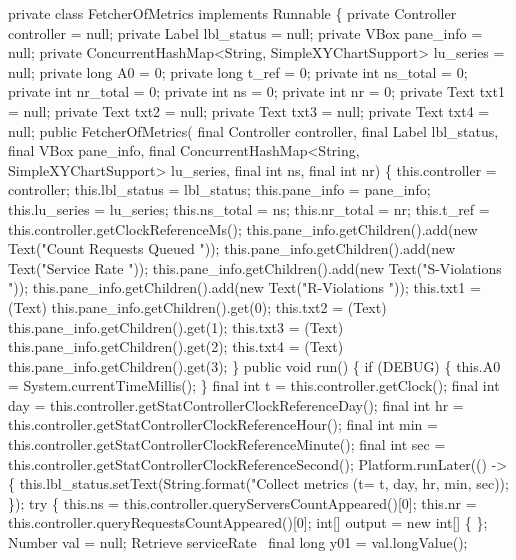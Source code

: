 \nwenddocs{}\plusendmoddef
private class FetcherOfMetrics implements Runnable \{
  private Controller controller = null;
  private Label lbl_status = null;
  private VBox pane_info = null;
  private ConcurrentHashMap<String, SimpleXYChartSupport> lu_series = null;
  private long A0 = 0;
  private long t_ref = 0;
  private int ns_total = 0;
  private int nr_total = 0;
  private int ns = 0;
  private int nr = 0;
  private Text txt1 = null;
  private Text txt2 = null;
  private Text txt3 = null;
  private Text txt4 = null;
  public FetcherOfMetrics(
      final Controller controller,
      final Label lbl_status,
      final VBox pane_info,
      final ConcurrentHashMap<String, SimpleXYChartSupport> lu_series,
      final int ns,
      final int nr) \{
    this.controller = controller;
    this.lbl_status = lbl_status;
    this.pane_info = pane_info;
    this.lu_series = lu_series;
    this.ns_total = ns;
    this.nr_total = nr;
    this.t_ref = this.controller.getClockReferenceMs();
    this.pane_info.getChildren().add(new Text("Count Requests Queued "));
    this.pane_info.getChildren().add(new Text("Service Rate "));
    this.pane_info.getChildren().add(new Text("S-Violations "));
    this.pane_info.getChildren().add(new Text("R-Violations "));
    this.txt1 = (Text) this.pane_info.getChildren().get(0);
    this.txt2 = (Text) this.pane_info.getChildren().get(1);
    this.txt3 = (Text) this.pane_info.getChildren().get(2);
    this.txt4 = (Text) this.pane_info.getChildren().get(3);
  \}
  public void run() \{
    if (DEBUG) \{
      this.A0 = System.currentTimeMillis();
    \}
    final int t = this.controller.getClock();
    final int day = this.controller.getStatControllerClockReferenceDay();
    final int hr = this.controller.getStatControllerClockReferenceHour();
    final int min = this.controller.getStatControllerClockReferenceMinute();
    final int sec = this.controller.getStatControllerClockReferenceSecond();
    Platform.runLater(() -> \{
      this.lbl_status.setText(String.format("Collect metrics (t=%
        t, day, hr, min, sec));
    \});
    try \{
      this.ns = this.controller.queryServersCountAppeared()[0];
      this.nr = this.controller.queryRequestsCountAppeared()[0];
      int[] output = new int[] \{ \};
      Number val = null;
      \LA{}Retrieve serviceRate~{\nwtagstyle{}}\RA{}               final long y01 = val.longValue();

